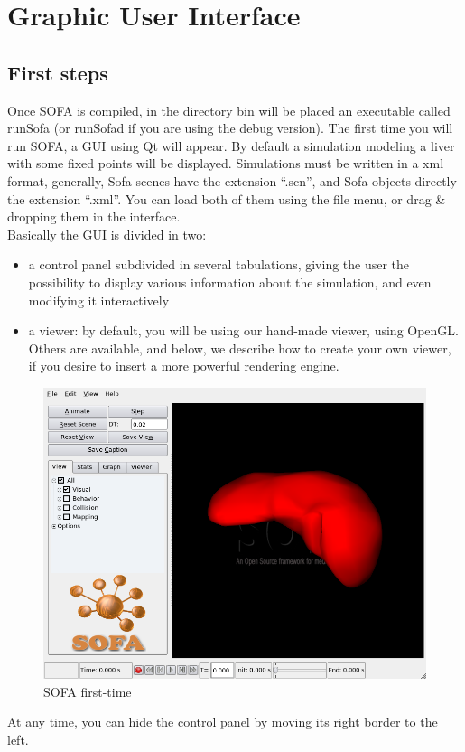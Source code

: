 
\newpage
\section{Graphic User Interface}
\subsection{First steps}
\par
Once SOFA is compiled, in the directory bin will be placed an executable called runSofa (or runSofad if you are using the debug version).
The first time you will run SOFA, a GUI using Qt will appear. By default a simulation modeling a liver with some fixed points will be displayed. Simulations must be written in a xml format, generally, Sofa scenes have the extension ``.scn'', and Sofa objects directly the extension ``.xml''. You can load both of them using the file menu, or drag \& dropping them in the interface.\\
Basically the GUI is divided in two: 
\begin{itemize}
 \item a control panel subdivided in several tabulations, giving the user the possibility to display various information about the simulation, and even modifying it interactively
 \item a viewer: by default, you will be using our hand-made viewer, using OpenGL. Others are available, and below, we describe how to create your own viewer, if you desire to insert a more powerful rendering engine.
\end{itemize}

\begin{figure}[htpb]
	\centering
		\includegraphics[width=1.0\textwidth]{GUI/GUI.png}
	\caption{SOFA first-time}
\end{figure}
At any time, you can hide the control panel by moving its right border to the left.
\newline

